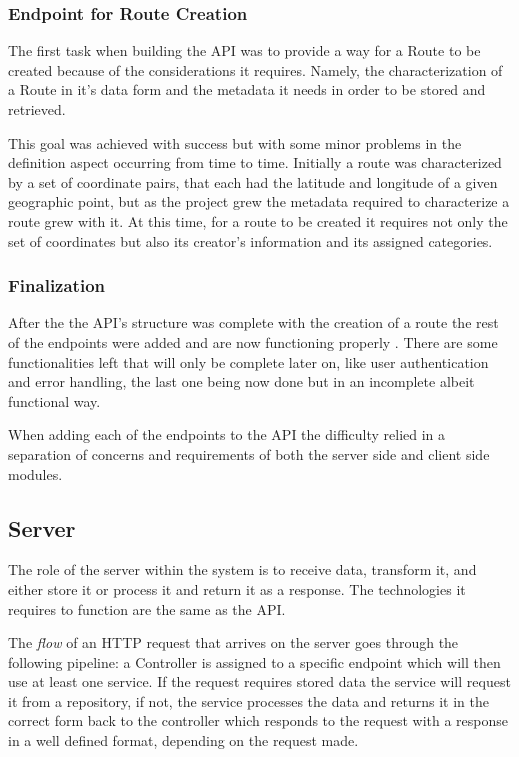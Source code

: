 \documentclass{article}
\begin{document}
            \newpage

            \subsubsection*{Endpoint for Route Creation}
            The first task when building the API was to provide a way for a Route to be created because of the considerations it requires. Namely, the 
            characterization of a Route in it's data form and the metadata it needs in order to be stored and retrieved.\par
            
            This goal was achieved with success \cite{routecreationdocs} but with some minor problems in the definition aspect occurring from time to time. 
            Initially a route was characterized by a set of coordinate pairs, that each had the latitude and longitude of a given geographic point, but 
            as the project grew the metadata required to characterize a route grew with it. At this time, for a route to be created it requires not only the 
            set of coordinates but also its creator's information and its assigned categories.

            \subsubsection*{Finalization}
            After the the API's structure was complete with the creation of a route the rest of the endpoints were added and are now functioning properly \cite{apidocs}.
            There are some functionalities left that will only be complete later on, like user authentication and error handling, the last one being now done 
            but in an incomplete albeit functional way.

            When adding each of the endpoints to the API the difficulty relied in a separation of concerns and requirements of both the server side and client side modules.
        
            \newpage
        
        \subsection{Server}    
            The role of the server within the system is to receive data, transform it, and either store it or process it and return it as a response. The technologies
            it requires to function are the same as the API.\par
            The \textit{flow} of an HTTP request that arrives on the server goes through the following pipeline: a Controller is assigned to a specific endpoint which will then
            use at least one service. If the request requires stored data the service will request it from a repository, if not, the service processes the data and returns 
            it in the correct form back to the controller which responds to the request with a response in a well defined format, depending on the request made. 
\end{document}
